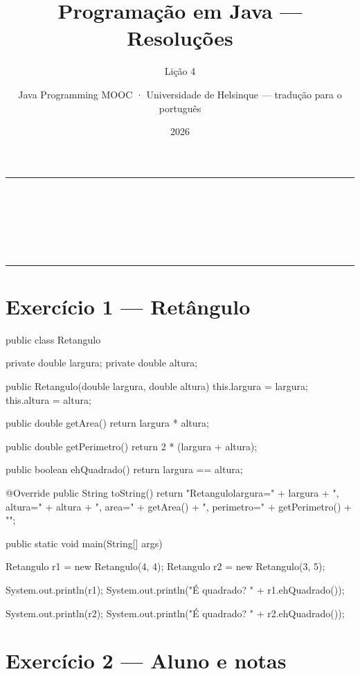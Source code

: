 \documentclass[11pt,a4paper]{article}
\title{Programação em Java — Resoluções}
\subtitle{Lição 4}
\author{Java Programming MOOC · Universidade de Helsinque — tradução para o português}
\date{2026}
\makeatletter
\renewcommand{\maketitle}{%
  \begin{center}
    {\color{javaRule}\rule{\linewidth}{1pt}}\\[6pt]
    {\Huge\sffamily\bfseries\color{javaOrange} \@title}\\[6pt]
    \ifx\@subtitle\undefined\else
      {\Large\sffamily\color{javaDeep} \@subtitle}\\[4pt]
    \fi
    {\small\sffamily\color{gray} \@author}\\[2pt]
    {\small\sffamily\color{gray} \@date}\\[6pt]
    {\color{javaRule}\rule{\linewidth}{1pt}}
  \end{center}
  \vspace{1em}
}
\makeatother
\begin{document}
\maketitle
\tableofcontents
\vspace{1.5em}

\section{Exercício 1 --- Retângulo}

\begin{javacode}
public class Retangulo {
    private double largura;
    private double altura;

    public Retangulo(double largura, double altura) {
        this.largura = largura;
        this.altura = altura;
    }

    public double getArea() {
        return largura * altura;
    }

    public double getPerimetro() {
        return 2 * (largura + altura);
    }

    public boolean ehQuadrado() {
        return largura == altura;
    }

    @Override
    public String toString() {
        return "Retangulo{largura=" + largura + ", altura=" + altura +
               ", area=" + getArea() + ", perimetro=" + getPerimetro() + "}";
    }

    public static void main(String[] args) {
        Retangulo r1 = new Retangulo(4, 4);
        Retangulo r2 = new Retangulo(3, 5);

        System.out.println(r1);
        System.out.println("É quadrado? " + r1.ehQuadrado());

        System.out.println(r2);
        System.out.println("É quadrado? " + r2.ehQuadrado());
    }
}
\end{javacode}

\section{Exercício 2 --- Aluno e notas}
\end{document}
